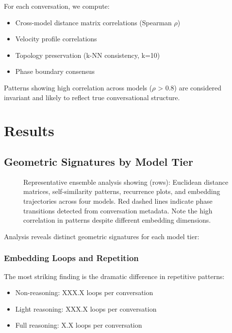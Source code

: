 \documentclass[11pt,letterpaper]{article}
\newcommand{\fullLoops}{X.X}
\newcommand{\lightLoops}{XXX.X}
\newcommand{\nonLoops}{XXX.X}
\begin{document}
For each conversation, we compute:
\begin{itemize}
\item Cross-model distance matrix correlations (Spearman $\rho$)
\item Velocity profile correlations
\item Topology preservation (k-NN consistency, k=10)
\item Phase boundary consensus
\end{itemize}

Patterns showing high correlation across models ($\rho$ > 0.8) are considered invariant and likely to reflect true conversational structure.

\section{Results}

\subsection{Geometric Signatures by Model Tier}

\begin{figure}[h]
\caption{Representative ensemble analysis showing (rows): Euclidean distance matrices, self-similarity patterns, recurrence plots, and embedding trajectories across four models. Red dashed lines indicate phase transitions detected from conversation metadata. Note the high correlation in patterns despite different embedding dimensions.}
\label{fig:ensemble}
\end{figure}

Analysis reveals distinct geometric signatures for each model tier:

\subsubsection{Embedding Loops and Repetition}

The most striking finding is the dramatic difference in repetitive patterns:
\begin{itemize}
\item Non-reasoning: \nonLoops{} loops per conversation
\item Light reasoning: \lightLoops{} loops per conversation
\item Full reasoning: \fullLoops{} loops per conversation
\end{itemize}
\end{document}
